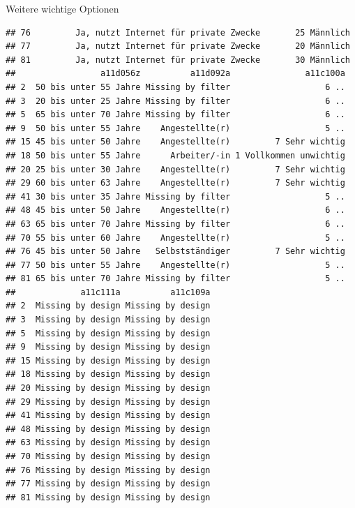 \documentclass[ignorenonframetext,]{beamer}
\begin{document}
\begin{frame}[fragile]{Weitere wichtige Optionen}
\begin{verbatim}
## 76         Ja, nutzt Internet für private Zwecke       25 Männlich
## 77         Ja, nutzt Internet für private Zwecke       20 Männlich
## 81         Ja, nutzt Internet für private Zwecke       30 Männlich
##                 a11d056z          a11d092a               a11c100a
## 2  50 bis unter 55 Jahre Missing by filter                   6 ..
## 3  20 bis unter 25 Jahre Missing by filter                   6 ..
## 5  65 bis unter 70 Jahre Missing by filter                   6 ..
## 9  50 bis unter 55 Jahre    Angestellte(r)                   5 ..
## 15 45 bis unter 50 Jahre    Angestellte(r)         7 Sehr wichtig
## 18 50 bis unter 55 Jahre      Arbeiter/-in 1 Vollkommen unwichtig
## 20 25 bis unter 30 Jahre    Angestellte(r)         7 Sehr wichtig
## 29 60 bis unter 63 Jahre    Angestellte(r)         7 Sehr wichtig
## 41 30 bis unter 35 Jahre Missing by filter                   5 ..
## 48 45 bis unter 50 Jahre    Angestellte(r)                   6 ..
## 63 65 bis unter 70 Jahre Missing by filter                   6 ..
## 70 55 bis unter 60 Jahre    Angestellte(r)                   5 ..
## 76 45 bis unter 50 Jahre   Selbstständiger         7 Sehr wichtig
## 77 50 bis unter 55 Jahre    Angestellte(r)                   5 ..
## 81 65 bis unter 70 Jahre Missing by filter                   5 ..
##             a11c111a          a11c109a
## 2  Missing by design Missing by design
## 3  Missing by design Missing by design
## 5  Missing by design Missing by design
## 9  Missing by design Missing by design
## 15 Missing by design Missing by design
## 18 Missing by design Missing by design
## 20 Missing by design Missing by design
## 29 Missing by design Missing by design
## 41 Missing by design Missing by design
## 48 Missing by design Missing by design
## 63 Missing by design Missing by design
## 70 Missing by design Missing by design
## 76 Missing by design Missing by design
## 77 Missing by design Missing by design
## 81 Missing by design Missing by design
\end{verbatim}

\end{frame}
\end{document}
